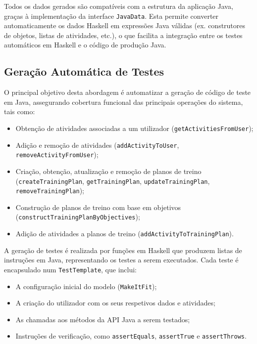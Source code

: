\documentclass[12pt, a4paper]{article}
\begin{document}
Todos os dados gerados são compatíveis com a estrutura da aplicação Java, graças à implementação da
interface \texttt{JavaData}. Esta permite converter automaticamente os dados Haskell em expressões
Java válidas (ex. construtores de objetos, listas de atividades, etc.), o que facilita a integração
entre os testes automáticos em Haskell e o código de produção Java.

\subsection{Geração Automática de Testes}

O principal objetivo desta abordagem é automatizar a geração de código de teste em Java, assegurando
cobertura funcional das principais operações do sistema, tais como:

\begin{itemize}
  \item Obtenção de atividades associadas a um utilizador (\texttt{getActivitiesFromUser});
  \item Adição e remoção de atividades (\texttt{addActivityToUser},
  \texttt{removeActivityFromUser});
  \item Criação, obtenção, atualização e remoção de planos de treino (\texttt{createTrainingPlan},
  \texttt{getTrainingPlan}, \texttt{updateTrainingPlan}, \texttt{removeTrainingPlan});
  \item Construção de planos de treino com base em objetivos
  (\texttt{constructTrainingPlanByObjectives});
  \item Adição de atividades a planos de treino (\texttt{addActivityToTrainingPlan}).
\end{itemize}

A geração de testes é realizada por funções em Haskell que produzem listas de instruções em Java,
representando os testes a serem executados. Cada teste é encapsulado num \texttt{TestTemplate}, que
inclui:

\begin{itemize}
  \item A configuração inicial do modelo (\texttt{MakeItFit});
  \item A criação do utilizador com os seus respetivos dados e atividades;
  \item As chamadas aos métodos da API Java a serem testados;
  \item Instruções de verificação, como \texttt{assertEquals}, \texttt{assertTrue} e \texttt{assertThrows}.
\end{itemize}
\end{document}

